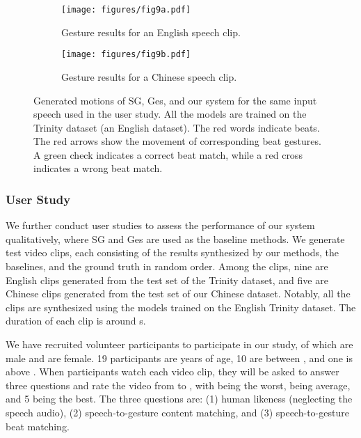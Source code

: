 \documentclass[acmtog,authorversion]{acmart}
\begin{document}
\begin{figure*}[t]
    \centering
    \begin{subfigure}[t]{0.48\textwidth}
        \centering
        \texttt{[image: figures/fig9a.pdf]}
        \caption{Gesture results for an English speech clip.}
        \label{fig:fig9a}
    \end{subfigure}
    \hspace{\fill}
    \begin{subfigure}[t]{0.48\textwidth}
        \centering
        \texttt{[image: figures/fig9b.pdf]}
        \caption{Gesture results for a Chinese speech clip.}
        \label{fig:fig9b}
    \end{subfigure}
    \caption{Generated motions of SG, Ges, and our system for the same input speech used in the user study. All the models are trained on the Trinity dataset (an English dataset). The red words indicate beats. The red arrows show the movement of corresponding beat gestures. A green check indicates a correct beat match, while a red cross indicates a wrong beat match.}
    \label{fig:fig9}
    \Description{}
\end{figure*}

\subsubsection{User Study}
\label{subsubsec:user_study}
We further conduct user studies to assess the performance of our system qualitatively, where SG \cite{alexanderson2020style} and Ges \cite{kucherenko2020gesticulator} are used as the baseline methods. 
We generate  test video clips, each consisting of the results synthesized by our methods, the baselines, and the ground truth in random order. Among the  clips, nine are English clips generated from the test set of the Trinity dataset, and five are Chinese clips generated from the test set of our Chinese dataset. Notably, all the clips are synthesized using the models trained on the English Trinity dataset. The duration of each clip is around s. 

We have recruited  volunteer participants to participate in our study, of which  are male and  are female. 19 participants are  years of age, 10 are between , and one is above . When participants watch each video clip, they will be asked to answer three questions and rate the video from  to , with  being the worst,  being average, and 5 being the best. The three questions are: (1) human likeness (neglecting the speech audio), (2) speech-to-gesture content matching, and (3) speech-to-gesture beat matching. 
\end{document}
